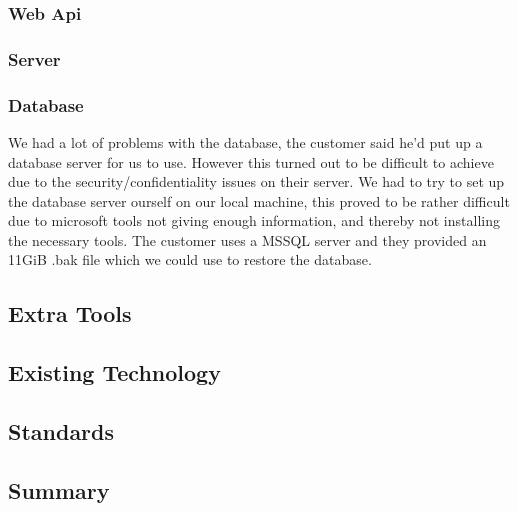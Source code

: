 \subsubsection{Web Api}
\subsubsection{Server}
\subsubsection{Database}
We had a lot of problems with the database, the customer said he'd put up a database server for us to use. However this turned out to be difficult to achieve due to the security/confidentiality issues on their server. We had to try to set up the database server ourself on our local machine, this proved to be rather difficult due to microsoft tools not giving enough information, and thereby not installing the necessary tools.     
The customer uses a MSSQL server and they provided an 11GiB .bak file which we could use to restore the database.
\subsection{Extra Tools}
\subsection{Existing Technology}

\subsection{Standards}

\subsection{Summary}